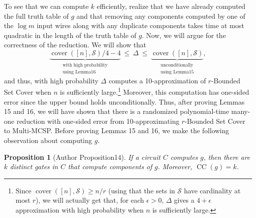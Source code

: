 \documentclass[10pt,a4paper]{article}
\newtheorem{ntproposition}[nttheorem]{Proposition}
\newcommand{\CCirc}{\operatorname{CC}}
\begin{document}
To see that we can compute $k$ efficiently, realize that we have already computed the full truth table of $g$ and that removing any components computed by one of the $\log m$ input wires along with any duplicate components takes time at most quadratic in the length of the truth table of $g$.
Now, we will argue for the correctness of the reduction. We will show that
\[\underbrace{\operatorname{cover}([n],\mathcal S)/4-4}_{\substack{\text{with high probability}\\\text{using Lemma16}}}\ \leq\ \Delta\ \leq\ \underbrace{\operatorname{cover}([n],\mathcal S)}_{\substack{\text{unconditionally}\\\text{using Lemma15}}},\]
and thus, with high probability $\Delta$ computes a 10-approximation of $r$-Bounded Set Cover when $n$ is sufficiently large.\footnote{Since $\operatorname{cover}([n],\mathcal S)\geq n/r$ (using that the sets in $\mathcal S$ have cardinality at most $r$), we will actually get that, for each $\epsilon>0$, $\Delta$ gives a $4+\epsilon$ approximation with high probability when $n$ is sufficiently large.} Moreover, this computation has one-sided error since the upper bound holds unconditionally.
Thus, after proving Lemmas 15 and 16, we will have shown that there is a randomized polynomial-time many-one reduction with one-sided error from 10-approximating $r$-Bounded Set Cover to Multi-MCSP.
Before proving Lemmas 15 and 16, we make the following observation about computing $g$.
\setcounter{nttheorem}{13}
\begin{ntproposition}[Author Proposition14]
If a circuit $C$ computes $g$, then there are $k$ distinct gates in $C$ that compute components of $g$. Moreover, $\CCirc(g)=k$.
\end{ntproposition}
\end{document}
